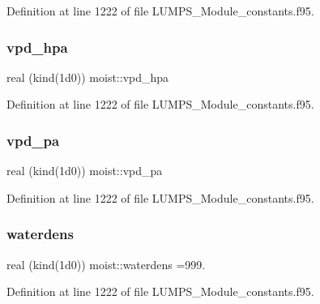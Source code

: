 Definition at line 1222 of file L\+U\+M\+P\+S\+\_\+\+Module\+\_\+constants.\+f95.

\mbox{\label{namespacemoist_aad393ebb822062a86d42176ac76b30ad}} 
\subsubsection{\texorpdfstring{vpd\+\_\+hpa}{vpd\_hpa}}
{\footnotesize\ttfamily real (kind(1d0)) moist\+::vpd\+\_\+hpa}



Definition at line 1222 of file L\+U\+M\+P\+S\+\_\+\+Module\+\_\+constants.\+f95.

\mbox{\label{namespacemoist_a86ab3b130c4af24cd94e0859a73c58e6}} 
\subsubsection{\texorpdfstring{vpd\+\_\+pa}{vpd\_pa}}
{\footnotesize\ttfamily real (kind(1d0)) moist\+::vpd\+\_\+pa}



Definition at line 1222 of file L\+U\+M\+P\+S\+\_\+\+Module\+\_\+constants.\+f95.

\mbox{\label{namespacemoist_a7d9cfae074d81f978b44ac92bf94b32b}} 
\subsubsection{\texorpdfstring{waterdens}{waterdens}}
{\footnotesize\ttfamily real (kind(1d0)) moist\+::waterdens =999.}



Definition at line 1222 of file L\+U\+M\+P\+S\+\_\+\+Module\+\_\+constants.\+f95.

